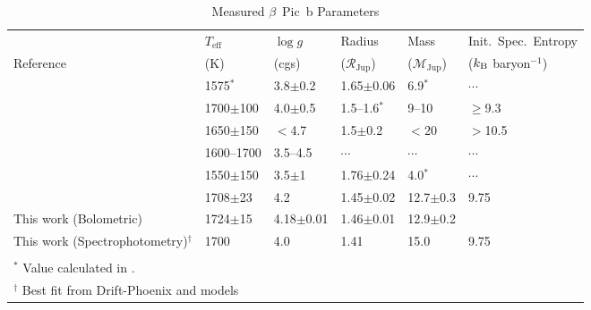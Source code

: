 \documentclass[twocolumn]{aastex6}
\newcommand{\teff}{$T_\mathrm{eff}$}
\newcommand{\logg}{$\log g$~}
\newcommand{\rjup}{$\mathcal{R}_\mathrm{Jup}$}
\newcommand{\mjup}{$\mathcal{M}_\mathrm{Jup}$}
\begin{document}
\begin{table*}
	\caption{Measured $\beta$~Pic~b Parameters}
	\nopagebreak
	\centering
	\begin{tabular}{llllll}
		\hline
		\hline
		& \teff	& \logg	& Radius  & Mass & Init.\ Spec.\ Entropy \\
		Reference & (K) & (cgs) & (\rjup) & (\mjup) & ($k_{\rm B}$ baryon$^{-1}$) \\
		\hline
		\citet{Currie2013} & 1575$^*$ & 3.8$\pm$0.2 & 1.65$\pm$0.06 & 6.9$^*$ & $\cdots$ \\
		\citet{Bonnefoy2013} & 1700$\pm$100	& 4.0$\pm$0.5 & 1.5--1.6$^*$  & 9--10 & $\geq$9.3 \\
		\citet{Bonnefoy2014} & 1650$\pm$150	& $<$4.7 & 1.5$\pm$0.2 & $<$20	& $>$10.5 \\
		\citet{Chilcote2015} & 1600--1700 & 3.5--4.5 & $\cdots$ & $\cdots$ & $\cdots$ \\
		\citet{Baudino2015} & 1550$\pm$150 & 3.5$\pm$1 & 1.76$\pm$0.24 & 4.0$^*$ & $\cdots$ \\
		\citet{Morzinski2015} & 1708$\pm$23 & 4.2 & 1.45$\pm$0.02 & 12.7$\pm$0.3 & 9.75 \\
		This work (Bolometric) & 1724$\pm$15 & 4.18$\pm$0.01 & 1.46$\pm$0.01 & 12.9$\pm$0.2  & \\
		This work (Spectrophotometry)$^\dagger$ & 1700 & 4.0 & 1.41 & 15.0 & 9.75\\
		\hline
		\multicolumn{6}{l}{}	\\     
		\multicolumn{6}{l}{$^*$ Value calculated in \citet{Morzinski2015}.} \\
		\multicolumn{6}{l}{$^\dagger$ Best fit from Drift-Phoenix and \citet{SpiegelBurrows2012} models}\\
	\end{tabular}
	\label{tbl:allworks}
\end{table*}

\clearpage
\end{document}

